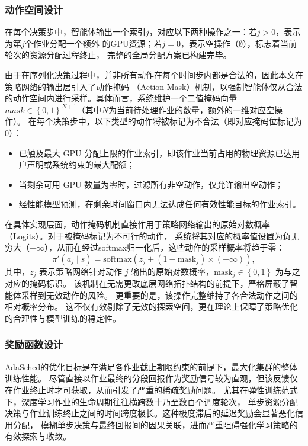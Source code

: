 \subsubsection{动作空间设计}\label{subsec:action}

在每个决策步中，智能体输出一个索引$j$，对应以下两种操作之一：若$j > 0$，表示为第$j$个作业分配一个额外
的GPU资源；若$j = 0$，表示空操作（$\emptyset$），标志着当前轮次的资源分配过程终止，
完整的全局分配方案已构建完毕。

由于在序列化决策过程中，并非所有动作在每个时间步内都是合法的，因此本文在策略网络的输出层引入了动作掩码
（Action Mask）机制，以强制智能体仅从合法的动作空间内进行采样。具体而言，系统维护一个二值掩码向量
$mask \in \left\{0, 1\right\}^{N+1}$（其中$N$为当前待处理作业的数量，额外的一维对应空操作）。
在每个决策步中，以下类型的动作将被标记为不合法（即对应掩码位标记为$0$）：
\begin{itemize}
  \item 已触及最大 GPU 分配上限的作业索引，即该作业当前占用的物理资源已达用户声明或系统约束的最大配额；
  \item 当剩余可用 GPU 数量为零时，过滤所有非空动作，仅允许输出空动作；
  \item 经性能模型预测，在剩余时间窗口内无法达成任何有效性能目标的作业索引。
\end{itemize}

在具体实现层面，动作掩码机制直接作用于策略网络输出的原始对数概率（Logits）。对于被掩码标记为不可行的动作，
系统将其对应的概率值设置为负无穷大（$-\infty$），从而在经过softmax归一化后，这些动作的采样概率将趋于零：
\begin{equation}\label{eq:action-mask}
  \pi'\left(a_j \mid s\right) = \text{softmax}\left(z_j + \left(1 - \text{mask}_j\right) \times \left(-\infty\right)\right),
\end{equation}
其中，$z_j$ 表示策略网络针对动作 $j$ 输出的原始对数概率，$\text{mask}_j \in \left\{0, 1\right\}$ 为与之对应的掩码标识。
该机制在无需更改底层网络拓扑结构的前提下，严格屏蔽了智能体采样到无效动作的风险。
更重要的是，该操作完整维持了各合法动作之间的相对概率分布。
这不仅有效剔除了无效的探索空间，更在理论上保障了策略优化的合理性与模型训练的稳定性。


\subsubsection{奖励函数设计}\label{subsec:reward}

AdaSched的优化目标是在满足各作业截止期限约束的前提下，最大化集群的整体训练性能。
尽管直接以作业最终的分段回报作为奖励信号较为直观，但该反馈仅在作业终止时才可获取，从而引发了严重的稀疏奖励问题。
尤其在弹性训练范式下，深度学习作业的生命周期往往横跨数十乃至数百个调度轮次，
单步资源分配决策与作业训练终止之间的时间跨度极长。这种极度滞后的延迟奖励会显著恶化信用分配，
模糊单步决策与最终回报间的因果关联，进而严重阻碍强化学习策略的有效探索与收敛。

